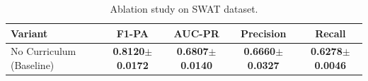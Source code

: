 \begin{table}[h]
\centering
\caption{Ablation study on SWAT dataset.}
\label{tab:ablation}
\begin{tabular}{lcccc}
\toprule
\textbf{Variant} & \textbf{F1-PA} & \textbf{AUC-PR} & \textbf{Precision} & \textbf{Recall} \\
\midrule
No Curriculum (Baseline) & \textbf{0.8120$\pm$0.0172} & \textbf{0.6807$\pm$0.0140} & \textbf{0.6660$\pm$0.0327} & \textbf{0.6278$\pm$0.0046} \\
\bottomrule
\end{tabular}
\end{table}